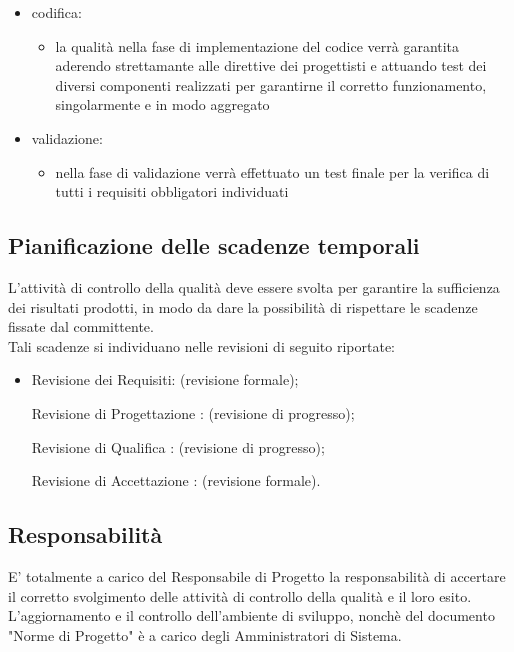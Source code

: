 \begin{itemize}
\begin{itemize}
			\end{itemize}
		\item codifica: 
			\begin{itemize}
				\item la qualità nella fase di implementazione del codice verrà garantita aderendo strettamante alle direttive dei progettisti e attuando test dei diversi componenti realizzati per garantirne il corretto funzionamento, singolarmente e in modo aggregato
			\end{itemize}
		\item validazione:
			\begin{itemize}
				\item nella fase di validazione verrà effettuato un test finale per la verifica di tutti i requisiti obbligatori individuati
			\end{itemize}
	\end{itemize}
	\subsection{Pianificazione delle scadenze temporali}
	L'attività di controllo della qualità deve essere svolta per garantire la sufficienza dei risultati prodotti, in modo da dare la possibilità di rispettare le scadenze fissate dal committente.\\
	Tali scadenze si individuano nelle revisioni di seguito riportate:
		\begin{itemize}
			\item Revisione dei Requisiti:  (revisione formale);
			\item[Revisione di Progettazione]: (revisione di progresso);
			\item[Revisione di Qualifica]: (revisione di progresso);
			\item[Revisione di Accettazione]: (revisione formale).
		\end{itemize}
	
	\subsection{Responsabilità}
	E' totalmente a carico del Responsabile di Progetto la responsabilità di accertare il corretto svolgimento delle attività di controllo della qualità e il loro esito.\\
	L'aggiornamento e il controllo dell'ambiente di sviluppo, nonchè del documento "Norme di Progetto" è a carico degli Amministratori di Sistema.
